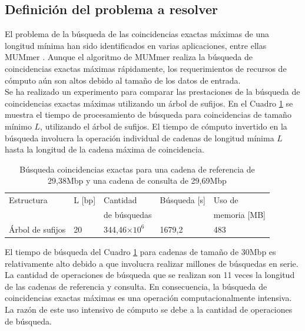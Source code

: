 \documentclass[12pt,a4paper]{article}
\providecommand{\e}[1]{\ensuremath{\times 10^{#1}}}
\begin{document}
\subsection{Definición del problema a resolver}
\indent
El problema de la búsqueda de las coincidencias exactas máximas de una longitud mínima han sido identificados en varias aplicaciones, entre ellas MUMmer \cite{Mummer3}. Aunque el algoritmo de MUMmer realiza la búsqueda de coincidencias exactas máximas rápidamente, los requerimientos de recursos de cómputo aún son altos debido al tamaño de los datos de entrada.\\
\indent
Se ha realizado un experimento para comparar las prestaciones de la búsqueda de
coincidencias exactas máximas utilizando un árbol de sufijos. En el Cuadro 
\ref{tab:buscar} se muestra el tiempo de procesamiento de búsqueda 
para coincidencias de tamaño mínimo $L$, utilizando el árbol de sufijos. El tiempo 
de cómputo invertido en la búsqueda involucra la operación individual de cadenas de longitud mínima $L$ hasta la longitud de la cadena máxima de coincidencia. \\
\begin{table}[ h!] 
  \begin{small}
    \begin{center}
      \begin{tabular}{lllll}
        Estructura & L [bp] & Cantidad  & Búsqueda [s] & Uso de\\
        & & de búsquedas & & memoria [MB] \\
        \hline
        Árbol de sufijos & 20 & 344,46\e{6}  & 1679,2 & 483 \\
        \hline
      \end{tabular}
    \end{center}
  \end{small}
  \caption{Búsqueda coincidencias exactas para una cadena de referencia de 
  29,38Mbp y una cadena de consulta de 29,69Mbp}
  \label{tab:buscar}
\end{table}
\indent
El tiempo de búsqueda del Cuadro \ref{tab:buscar} para cadenas de tamaño de 30Mbp
es relativamente alto debido a que involucra realizar millones de búsquedas en
serie. La cantidad de operaciones de búsqueda que se realizan son 11 veces la 
longitud de las cadenas de referencia y consulta. En consecuencia, la búsqueda 
de coincidencias exactas máximas es una operación computacionalmente intensiva. La razón de este uso intensivo de cómputo se debe a la cantidad de operaciones de búsqueda.\\
\end{document}
